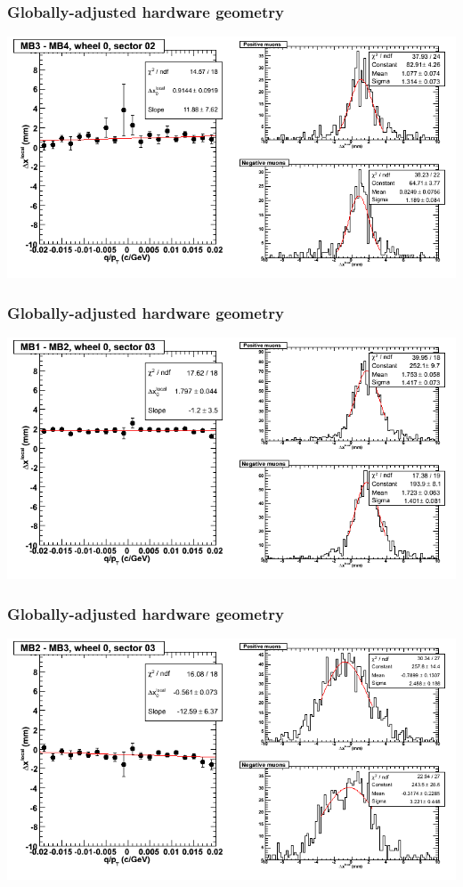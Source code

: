 \documentclass[compress]{beamer}
\begin{document}
\begin{frame}
\frametitle{Globally-adjusted hardware geometry}
\includegraphics[width=\linewidth]{NOV4_segdiffs_HW/dt13_resid_C_02_34.png}
\end{frame}

\begin{frame}
\frametitle{Globally-adjusted hardware geometry}
\includegraphics[width=\linewidth]{NOV4_segdiffs_HW/dt13_resid_C_03_12.png}
\end{frame}

\begin{frame}
\frametitle{Globally-adjusted hardware geometry}
\includegraphics[width=\linewidth]{NOV4_segdiffs_HW/dt13_resid_C_03_23.png}
\end{frame}
\end{document}
